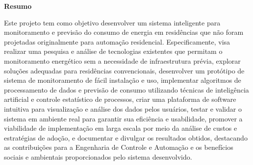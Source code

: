 
\begin{center}
\huge{{\bf Resumo}}
\vspace{2cm}
\end{center}


Este projeto tem como objetivo desenvolver um sistema inteligente para monitoramento e previsão do
consumo de energia em residências que não foram projetadas originalmente para automação residencial.
Especificamente, visa realizar uma pesquisa e análise de tecnologias existentes que permitam o
monitoramento energético sem a necessidade de infraestrutura prévia, explorar soluções adequadas para
residências convencionais, desenvolver um protótipo de sistema de monitoramento de fácil instalação e
uso, implementar algoritmos de processamento de dados e previsão de consumo utilizando técnicas de
inteligência artificial e controle estatístico de processos, criar uma plataforma de software intuitiva para visualização e análise dos dados pelos
usuários, testar e validar o sistema em ambiente real para garantir sua eficiência e usabilidade, promover a
viabilidade de implementação em larga escala por meio da análise de custos e estratégias de adoção, e
documentar e divulgar os resultados obtidos, destacando as contribuições para a Engenharia de Controle e
Automação e os benefícios sociais e ambientais proporcionados pelo sistema desenvolvido.


\clearpage
\thispagestyle{empty}
\cleardoublepage

